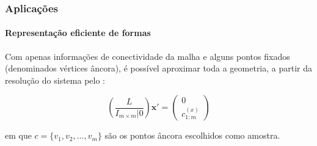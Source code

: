 \begin{frame}
\frametitle{Aplicações}
\framesubtitle{Representação eficiente de formas}

Com apenas informações de conectividade da malha e alguns pontos fixados (denominados vértices âncora), é possível aproximar toda a geometria, a partir da resolução do sistema pelo :

\begin{equation}\label{eq:sisrecover}
	\left( \frac{L}{I_{m \times m} | 0} \right) \mathbf{x'} = \begin{pmatrix}
		0\\
		c_{1:m}^{(x)}
	\end{pmatrix}
\end{equation}

em que $c = \{v_1, v_2, \dots, v_m\}$ são os pontos âncora escolhidos como amostra.

\end{frame}